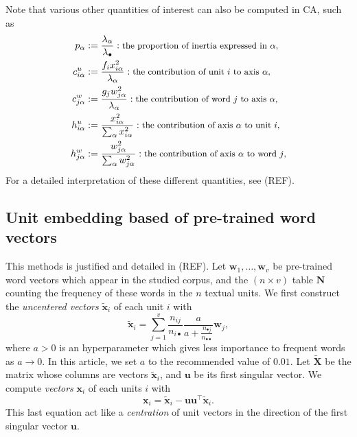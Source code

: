 \documentclass[
twocolumn,
]{ceurart}
\begin{document}
Note that various other quantities of interest can also be computed in CA, such as 
\begin{align*}
p_\alpha &:= \frac{\lambda_\alpha}{\lambda_\bullet} :\text{\small the proportion of inertia expressed in $\alpha$,} \\
c^u_{i \alpha} &:= \frac{f_i x_{i\alpha}^2}{\lambda_\alpha} : \text{\small the contribution of unit $i$ to axis $\alpha$,} \\
c^w_{j \alpha} &:= \frac{g_j w_{j\alpha}^2}{\lambda_\alpha} : \text{\small the contribution of word $j$ to axis $\alpha$,} \\
h^u_{i \alpha} &:= \frac{x_{i\alpha}^2}{\sum_{\alpha} x_{i\alpha}^2} : \text{\small the contribution of  axis $\alpha$ to unit $i$,} \\
h^w_{j \alpha} &:= \frac{w_{j\alpha}^2}{\sum_{\alpha} w_{j\alpha}^2} : \text{\small the contribution of  axis $\alpha$ to word $j$,}
\end{align*}
For a detailed interpretation of these different quantities, see (REF). 

\subsection{Unit embedding based of pre-trained word vectors}
\label{wv_details}

This methods is justified and detailed in (REF). Let $\mathbf{w}_1, \ldots, \mathbf{w}_v$ be pre-trained word vectors which appear in the studied corpus, and the $(n \times v)$ table $\mathbf{N}$ counting the frequency of these words in the $n$ textual units. We first construct the \emph{uncentered vectors} $\widetilde{\mathbf{x}}_i$ of each unit $i$ with
\begin{equation}
\widetilde{\mathbf{x}}_i = \sum_{j = 1}^v \frac{n_{ij}}{n_{i \bullet}} \frac{a}{a + \frac{n_{\bullet j}}{n_{\bullet \bullet}}} \mathbf{w}_j,
\end{equation}
where $a > 0$ is an hyperparameter which gives less importance to frequent words as $a \to 0$. In this article, we set $a$ to the recommended value of $0.01$. Let $\widetilde{\mathbf{X}}$ be the matrix whose columns are vectors $\widetilde{\mathbf{x}}_i$, and $\mathbf{u}$ be its first singular vector. We compute \emph{vectors} $\mathbf{x}_i$ of each units $i$ with
\begin{equation}
\mathbf{x}_i = \widetilde{\mathbf{x}}_i - \mathbf{u}\mathbf{u}^\top \widetilde{\mathbf{x}}_i.
\end{equation}
This last equation act like a \emph{centration} of unit vectors in the direction of the first singular vector $\mathbf{u}$.


\end{document}
